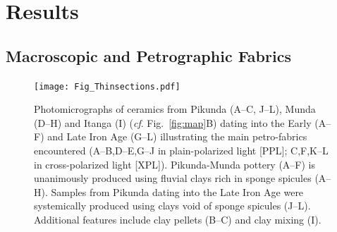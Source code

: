 \documentclass[smallextended,natbib]{svjour3}       %
\begin{document}
\section{Results}

\subsection{Macroscopic and Petrographic Fabrics}

\begin{figure}[!tb]
	\texttt{[image: Fig\_Thinsections.pdf]}
	\caption{Photomicrographs of ceramics from Pikunda (A--C, J--L), Munda (D--H) and Itanga (I) (\textit{cf}. Fig.~\ref{fig:map}B) dating into the Early (A--F) and Late Iron Age (G--L) illustrating the main petro-fabrics encountered (A--B,D--E,G--J in plain-polarized light [PPL]; C,F,K--L in cross-polarized light [XPL]). Pikunda-Munda pottery (A--F) is unanimously produced using fluvial clays rich in sponge spicules (A--H). Samples from Pikunda dating into the Late Iron Age were systemically produced using clays void of sponge spicules (J--L). Additional features include clay pellets (B--C) and clay mixing (I).}
	\label{fig:thinsections}
\end{figure}
\end{document}
